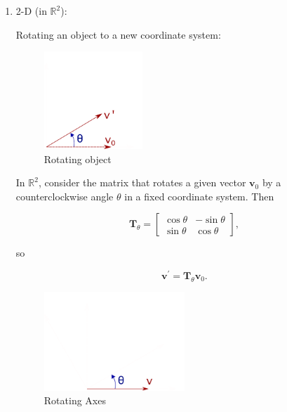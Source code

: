 \documentclass[10pt,b5paper,titlepage]{book}
\begin{document}
\begin{enumerate}
    \item 2-D (in $\mathbb{R}^{2}$):

        Rotating an object to a new coordinate system:

        \begin{figure}[ht]
            \centering
            \includegraphics[width=0.35\textwidth]{img/RotationMatrix_1000}
            \caption{Rotating object}
            \label{fig:RotationMatrix_1000-png}
        \end{figure}

        In $\mathbb{R}^{2}$, consider the matrix that rotates a given
        vector $\mathbf{v}_{0}$ by a counterclockwise angle $\theta$ in
        a fixed coordinate system. Then

        \begin{equation}
            \mathbf{T}_{\theta} = \begin{bmatrix}
                \cos \theta & -\sin \theta \\
                \sin \theta & \cos \theta
            \end{bmatrix}
        ,\end{equation}

        so

        \begin{equation}
            \mathbf{v}^{'} = \mathbf{T}_{\theta}\mathbf{v}_{0}
        .\end{equation}

        \begin{figure}[ht]
            \centering
            \includegraphics[width=0.5\textwidth]{img/RotationMatrixAxes_1000}
            \caption{Rotating Axes}
            \label{fig:RotationMatrixAxes_1000-png}
        \end{figure}


\end{enumerate}
\end{document}
